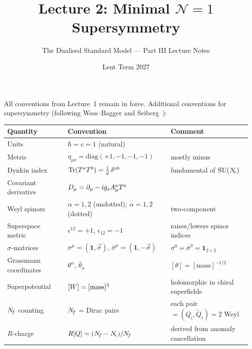 \documentclass[11pt,a4paper]{article}
\title{\textbf{Lecture 2: Minimal $\mathcal{N}=1$ Supersymmetry}}
\author{The Dualised Standard Model --- Part III Lecture Notes}
\date{Lent Term 2027}
\begin{document}
\maketitle

\tableofcontents
\newpage


\begin{conventionbox}[title={Conventions for Lecture 2}]
All conventions from Lecture~1 remain in force.  Additional conventions
for supersymmetry (following Wess--Bagger \cite{WessBagger} and
Seiberg~\cite{Seiberg1995}):

\renewcommand{\arraystretch}{1.3}
\begin{tabular}{@{}l l l@{}}
\toprule
\textbf{Quantity} & \textbf{Convention} & \textbf{Comment} \\
\midrule
Units & $\hbar = c = 1$ (natural) & \\
Metric & $\eta_{\mu\nu} = \mathrm{diag}(+1,-1,-1,-1)$ & mostly minus \\
Dynkin index & $\mathrm{Tr}(T^a T^b) = \tfrac{1}{2}\, \delta^{ab}$ & fundamental of $\mathrm{SU}(N_{\!c})$ \\
Covariant derivative & $D_\mu = \partial_\mu - ig_s A_\mu^a T^a$ & \\
Weyl spinors & $\alpha = 1,2$ (undotted); $\dot\alpha = 1,2$ (dotted) & two-component \\
Superspace metric & $\epsilon^{12} = +1$, $\epsilon_{12} = -1$ & raises/lowers spinor indices \\
$\sigma$-matrices & $\sigma^\mu = (\mathbf{1}, \vec{\sigma})$,
  $\bar\sigma^\mu = (\mathbf{1}, -\vec{\sigma})$ & $\sigma^0 = \bar\sigma^0 = \mathbf{1}_{2\times 2}$ \\
Grassmann coordinates & $\theta^\alpha$, $\bar\theta_{\dot\alpha}$ & $[\theta] = [\text{mass}]^{-1/2}$ \\
Superpotential & $[W] = [\text{mass}]^3$ & holomorphic in chiral superfields \\
$N_{\!f}$ counting & $N_{\!f}$ = Dirac pairs & each pair $= (Q_i, \widetilde{Q}_i) = 2$ Weyl \\
$R$-charge & $R[Q] = (N_{\!f} - N_{\!c})/N_{\!f}$ & derived from anomaly cancellation \\
\bottomrule
\end{tabular}
\end{conventionbox}
\end{document}
